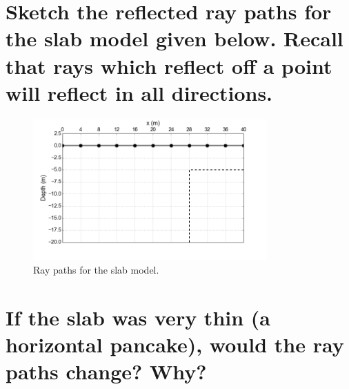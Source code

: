 \documentclass[twosides]{EOSC350Lab} %
\begin{document}

		\part{Sketch the reflected ray paths for the slab model given below. Recall that rays which reflect off a point will reflect in all directions.}
			\begin{figure}[H]
				\centering \includegraphics[width=0.8\textwidth]{Figures/wall.png}
				\caption{Ray paths for the slab model.}
				\label{fig:slab}
			\end{figure}

		\part{If the slab was very thin (a horizontal pancake), would the ray paths change? Why?}


				\vspace*{40pt}

\pagebreak
\end{document}
